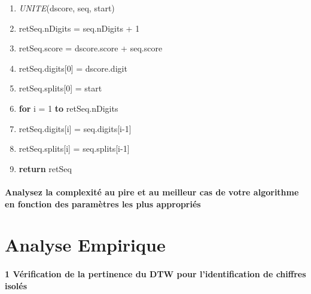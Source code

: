 \documentclass[a4paper,11pt]{article}
\begin{document}
\begin{center}
\vspace{1cm}

\begin{enumerate}
\large
\item[] \textit{UNITE}(dscore, seq, start)
\item
	retSeq.nDigits = seq.nDigits + 1
\item
	retSeq.score = dscore.score + seq.score
\item
	retSeq.digits[0] = dscore.digit
\item
	retSeq.splits[0] = start
\item
	\textbf{for} i = 1 \textbf{to} retSeq.nDigits
\item \hspace{1cm}
		retSeq.digits[i] = seq.digits[i-1]
	\item \hspace{1cm}
		retSeq.splits[i] = seq.splits[i-1]
\item \textbf{return} retSeq
\end{enumerate}
\end{center}

\subsection{Analysez la complexité au pire et au meilleur cas de votre algorithme en fonction des paramètres les plus appropriés}

\part{Analyse Empirique}

\subsection*{1 Vérification de la pertinence du DTW pour l'identification de chiffres isolés}

\label{tableau}
\end{document}
